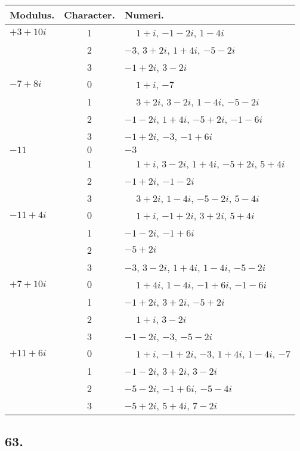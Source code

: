 \documentclass[twoside,12pt]{memoir}
\begin{document}
\begin{center}
\begin{tabular}{l|c|l}
Modulus. & Character. & Numeri. \\
\hline
\(+3+10 i\) & 1 & \(\phantom{+}1+i\), \(-1-2 i\), \(1-4 i\) \\
 & 2 & \(-3\), \(3+2 i\), \(1+4 i\), \(-5-2 i\) \\
 & 3 & \(-1+2 i\), \(3-2 i\) \\
\(-7+8 i\) & \(0\) & \(\phantom{+}1+i\), \(-7\) \\
 & 1 & \(\phantom{+}3+2 i\), \(3-2 i\), \(1-4 i\), \(-5-2 i\) \\
 & 2 & \(-1-2 i\), \(1+4 i\), \(-5+2 i\), \(-1-6 i\) \\
 & 3 & \(-1+2 i\), \(-3\), \(-1+6 i\) \\
\(-11\) & \(0\) & \(-3\) \\
 & 1 & \(\phantom{+}1+i\), \(3-2 i\), \(1+4 i\), \(-5+2 i\), \(5+4 i\) \\
 & 2 & \(-1+2 i\), \(-1-2 i\) \\
 & 3 & \(\phantom{+}3+2 i\), \(1-4 i\), \(-5-2 i\), \(5-4 i\) \\
\(-11+4 i\) & \(0\) & \(\phantom{+}1+i\), \(-1+2 i\), \(3+2 i\), \(5+4 i\) \\
 & 1 & \(-1-2 i\), \(-1+6 i\) \\
 & 2 & \(-5+2 i\) \\
 & 3 & \(-3\), \(3-2 i\), \(1+4 i\), \(1-4 i\), \(-5-2 i\) \\
\(+7+10 i\) & \(0\) & \(\phantom{+}1+4 i\), \(1-4 i\), \(-1+6 i\), \(-1-6 i\) \\
 & 1 & \(-1+2 i\), \(3+2 i\), \(-5+2 i\) \\
 & 2 & \(\phantom{+}1+i\), \(3-2 i\) \\
 & 3 & \(-1-2 i\), \(-3\), \(-5-2 i\) \\
\(+11+6 i\) & \(0\) & \(\phantom{+}1+i\), \(-1+2 i\), \(-3\), \(1+4 i\), \(1-4 i\), \(-7\) \\
 & 1 & \(-1-2 i\), \(3+2 i\), \(3-2 i\) \\
 & 2 & \(-5-2 i\), \(-1+6 i\), \(-5-4 i\) \\
 & 3 & \(-5+2 i\), \(5+4 i\), \(7-2 i\) \\
\end{tabular}
\end{center}

\subsection*{63.}
 
\end{document}
